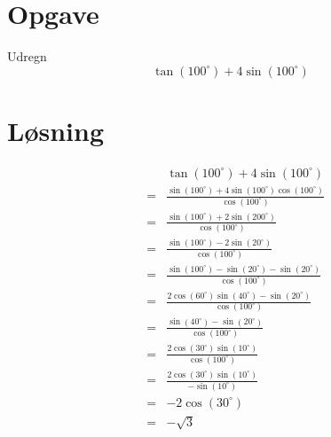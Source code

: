 \documentclass[12pt,oneside,a4paper]{article}
\newcommand{\bas}{\begin{eqnarray*}}
\newcommand{\eas}{\end{eqnarray*}}
\begin{document}
\section*{Opgave}
Udregn
$$
\tan(100^\circ) + 4\sin(100^\circ)
$$

\section*{Løsning}
\bas
&&\tan(100^\circ) + 4\sin(100^\circ) \\
&=&\frac{\sin(100^\circ) + 4\sin(100^\circ)\cos(100^\circ)}{\cos(100^\circ)} \\
&=&\frac{\sin(100^\circ) + 2\sin(200^\circ)}{\cos(100^\circ)} \\
&=&\frac{\sin(100^\circ) - 2\sin(20^\circ)}{\cos(100^\circ)} \\
&=&\frac{\sin(100^\circ) - \sin(20^\circ) - \sin(20^\circ)}{\cos(100^\circ)} \\
&=&\frac{2\cos(60^\circ)\sin(40^\circ) - \sin(20^\circ)}{\cos(100^\circ)} \\
&=&\frac{\sin(40^\circ) - \sin(20^\circ)}{\cos(100^\circ)} \\
&=&\frac{2\cos(30^\circ)\sin(10^\circ)}{\cos(100^\circ)} \\
&=&\frac{2\cos(30^\circ)\sin(10^\circ)}{-\sin(10^\circ)} \\
&=&-2\cos(30^\circ)\\
&=&-\sqrt{3}
\eas
\end{document}
